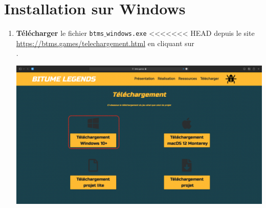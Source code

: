 \documentclass[a4paper,12pt]{article}
\begin{document}
    \section{Installation sur Windows}
        \begin{enumerate}
            \item
                \textbf{Télécharger} le fichier \texttt{btms$\_$windows.exe}
<<<<<<< HEAD
                depuis le site \\\url{https://btms.games/telechargement.html} en
                cliquant sur \\.\\
                \begin{center}
                    \includegraphics[scale=0.2]{dl_page_win.png}
                \end{center}
                

\end{enumerate}
\end{document}
